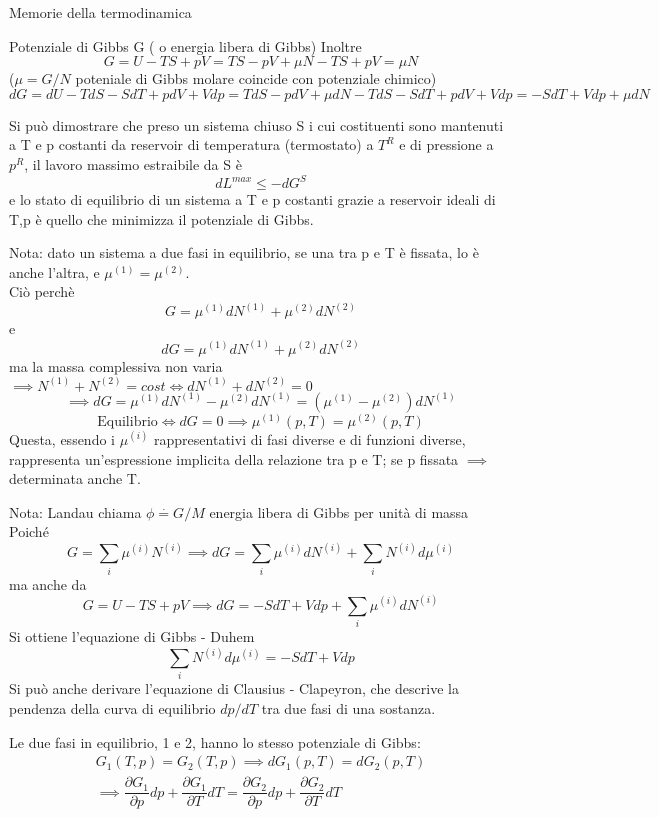 \documentclass[a4paper,11pt]{report}
\newcommand{\defeq}{\overset{\cdot}{=}}
\begin{document}
\begin{chapter}{Memorie della termodinamica}
\begin{section}{Potenziale di Gibbs G ( o energia libera di Gibbs)}
		Inoltre 
		\begin{equation}
			G = U -TS + pV = TS - pV + \mu N - TS + pV = \mu N
		\end{equation}
		($\mu = G/N $ poteniale di Gibbs molare coincide con potenziale chimico)
		\begin{equation}
			dG = dU -TdS - SdT + pdV + Vdp = TdS - pdV + \mu dN - TdS - SdT + pdV + Vdp = -SdT + Vdp + \mu dN
		\end{equation}
		
		Si può dimostrare che preso un sistema chiuso S i cui costituenti sono mantenuti a T e p costanti da reservoir di temperatura (termostato) a $T^R$ e di pressione a $p^R$, il lavoro massimo estraibile da S è 
		$$
		dL^{max} \leq -dG^S
		$$
		e lo stato di equilibrio di un sistema a T e p costanti grazie a reservoir ideali di T,p è quello che minimizza il potenziale di Gibbs.
		
		Nota: dato un sistema a due fasi in equilibrio, se una tra p e T è fissata, lo è anche l'altra, e $\mu^{(1)} = \mu^{(2)}$.\\
		Ciò perchè 
		$$
		G = \mu^{(1)} dN^{(1)} + \mu^{(2)} dN^{(2)}
		$$
		e
		$$
		dG = \mu^{(1)} dN^{(1)} + \mu^{(2)} dN^{(2)}
		$$
		ma la massa complessiva non varia $\implies N^{(1)} + N^{(2)} = cost \iff dN^{(1)} + dN^{(2)} = 0$
		$$
		\implies dG = \mu^{(1)} dN^{(1)} - \mu^{(2)} dN^{(1)} = (\mu^{(1)} - \mu^{(2)})dN^{(1)}
		$$
		$$
		\textrm{Equilibrio} \iff dG =0 \implies \mu^{(1)}(p,T) = \mu^{(2)}(p,T)
		$$
		Questa, essendo i $\mu^{(i)}$ rappresentativi di fasi diverse e di funzioni diverse, rappresenta un'espressione implicita della relazione tra p e T; se p fissata $\implies$ determinata anche T.
		
		Nota: Landau chiama $\phi \defeq G/M$ energia libera di Gibbs per unità di massa\\
		
		Poiché 
		$$
		G= \sum_i \mu^{(i)} N^{(i)} \implies dG = \sum_i \mu^{(i)} dN^{(i)} + \sum_i N^{(i)} d\mu^{(i)}
		$$
		ma anche da 
		$$
		G = U - TS + pV \implies dG = -SdT + Vdp + \sum_i \mu^{(i)} dN^{(i)}
		$$
		Si ottiene l'equazione di Gibbs - Duhem
		\begin{equation}
			\sum_i N^{(i)} d\mu^{(i)} = -SdT + Vdp
		\end{equation}
		Si può anche derivare l'equazione di Clausius - Clapeyron, che descrive la pendenza della curva di equilibrio $dp/dT$ tra due fasi di una sostanza.
		
		Le due fasi in equilibrio, 1 e 2, hanno lo stesso potenziale di Gibbs:
		\begin{multline}
			G_1(T,p) = G_2 (T,p) \implies dG_1(p,T)= dG_2(p,T) \\
			\implies \dfrac{\partial G_1}{\partial p} dp + \dfrac{\partial G_1}{\partial T}dT = \dfrac{\partial G_2}{\partial p}dp + \dfrac{\partial G_2}{\partial T}dT
		\end{multline}


\end{section}
\end{chapter}
\end{document}
